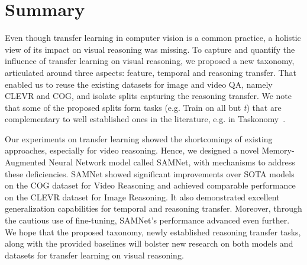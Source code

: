 \section{Summary}


Even though transfer learning in computer vision is a common practice, a holistic view of its impact on visual reasoning was missing.
To capture and quantify the influence of transfer learning on visual reasoning, we proposed a new taxonomy, articulated around three aspects: feature, temporal and reasoning transfer.  That enabled us to reuse the existing datasets for image and video QA, namely CLEVR and COG, and isolate splits capturing the reasoning transfer.
We note that some of the proposed splits form tasks (e.g. Train on all but \textit{t}) that are complementary to well established ones in the literature, e.g. in Taskonomy~\cite{zamir2018taskonomy}.

Our experiments on transfer learning showed the shortcomings of existing approaches, especially for video reasoning.  Hence, we designed a novel Memory-Augmented Neural Network model called SAMNet, with mechanisms to address these deficiencies.
SAMNet showed significant improvements over SOTA models on the COG dataset for Video Reasoning  and achieved comparable performance on the CLEVR dataset for Image Reasoning.
It also demonstrated excellent generalization capabilities for temporal and reasoning transfer. Moreover,  through the cautious use of fine-tuning, SAMNet's performance advanced even further.
We hope that the proposed taxonomy, newly established reasoning transfer tasks, along with the provided baselines will bolster new research on both models and datasets for transfer learning on visual reasoning.
